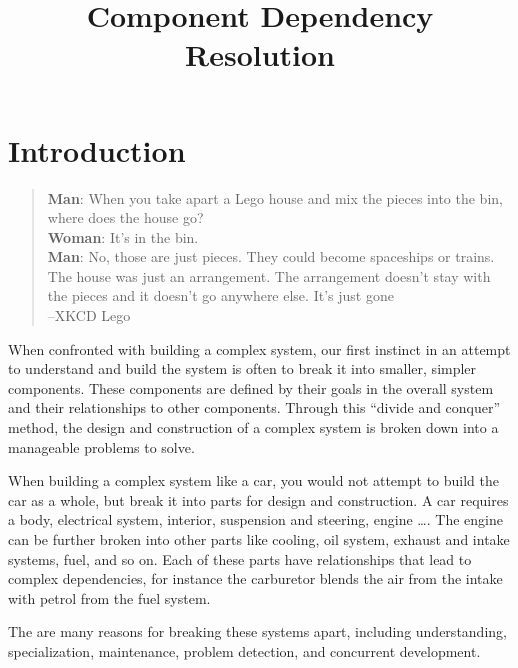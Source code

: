 \documentclass{report}
\title{Component Dependency Resolution}
\begin{document}
\chapter{Introduction}


\begin{quotation}
\textbf{Man}: When you take apart a Lego house and mix the pieces into the bin, where does the house go?\\
\textbf{Woman}: It's in the bin.\\
\textbf{Man}: No, those are just pieces. They could become spaceships or trains. 
The house was just an arrangement. The arrangement doesn't stay with the pieces and it doesn't go anywhere else. It's just gone\\
--XKCD Lego
\end{quotation}

{}When confronted with building a complex system, our first instinct in an attempt to understand and build the system is often to break it into smaller, simpler components. 
{}These components are defined by their goals in the overall system and their relationships to other components.
{}Through this ``divide and conquer'' method, the design and construction of a complex system is broken down into a manageable problems to solve.

When building a complex system like a car, you would not attempt to build the car as a whole, but break it into parts for design and construction.
A car requires a body, electrical system, interior, suspension and steering, engine \ldots. 
The engine can be further broken into other parts like cooling, oil system, exhaust and intake systems, fuel, and so on.
Each of these parts have relationships that lead to complex dependencies, for instance the carburetor blends the air from the intake with petrol from the fuel system.

The are many reasons for breaking these systems apart, including understanding, specialization, maintenance, problem detection, and concurrent development.

\end{document}
